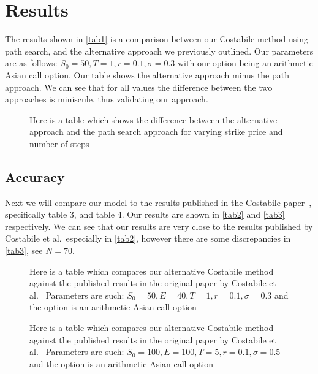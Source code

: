 \chapter{Results}

The results shown in \autoref{tab1} is a comparison between our Costabile method using path search, and the alternative approach we previously outlined. Our parameters are as follows: \(S_0 =50, T = 1, r= 0.1, \sigma = 0.3\) with our option being an arithmetic Asian call option. Our table shows the alternative approach minus the path approach. We can see that for all values the difference between the two approaches is miniscule, thus validating our approach.

\begin{figure}[H]
    \begin{center}
    \end{center}
    \caption{Here is a table which shows the difference between the alternative approach and the path search approach for varying strike price and number of steps}\label{tab1}
\end{figure}

\section{Accuracy}

Next we will compare our model to the results published in the Costabile paper~\cite{costabile2006adjusted}, specifically table 3, and table 4. Our results are shown in \autoref{tab2} and \autoref{tab3} respectively. We can see that our results are very close to the results published by Costabile et al.~especially in \autoref{tab2}, however there are some discrepancies in \autoref{tab3}, see \(N = 70\).

\begin{figure}[H]
    \begin{center}
    \end{center}
    \caption{Here is a table which compares our alternative Costabile method against the published results in the original paper by Costabile et al.~\cite{costabile2006adjusted} Parameters are such: \(S_0 = 50, E=40,T=1,r=0.1,\sigma=0.3\) and the option is an arithmetic Asian call option}\label{tab2}
\end{figure}

\begin{figure}[H]
    \begin{center}
    \end{center}
    \caption{Here is a table which compares our alternative Costabile method against the published results in the original paper by Costabile et al.~\cite{costabile2006adjusted} Parameters are such: \(S_0 = 100, E=100,T=5,r=0.1,\sigma=0.5\) and the option is an arithmetic Asian call option}\label{tab3}
\end{figure}

